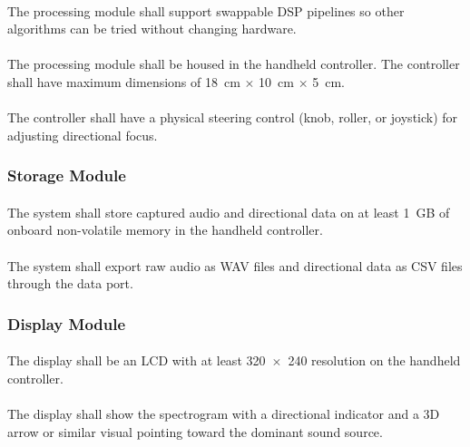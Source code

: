\paragraph{}
The processing module shall support swappable DSP pipelines so other algorithms can be tried without changing hardware.

\paragraph{}
The processing module shall be housed in the handheld controller.  The controller shall have maximum dimensions of 18~cm $\times$ 10~cm $\times$ 5~cm.

\paragraph{}
The controller shall have a physical steering control (knob, roller, or joystick) for adjusting directional focus.

\subsubsection{Storage Module}

\paragraph{}
The system shall store captured audio and directional data on at least 1~GB of onboard non-volatile memory in the handheld controller.

\paragraph{} \label{export}
The system shall export raw audio as WAV files and directional data as CSV files through the data port.

\subsubsection{Display Module}

\paragraph{}
The display shall be an LCD with at least 320~$\times$~240 resolution on the handheld controller.

\paragraph{}
The display shall show the spectrogram with a directional indicator and a 3D arrow or similar visual pointing toward the dominant sound source.

